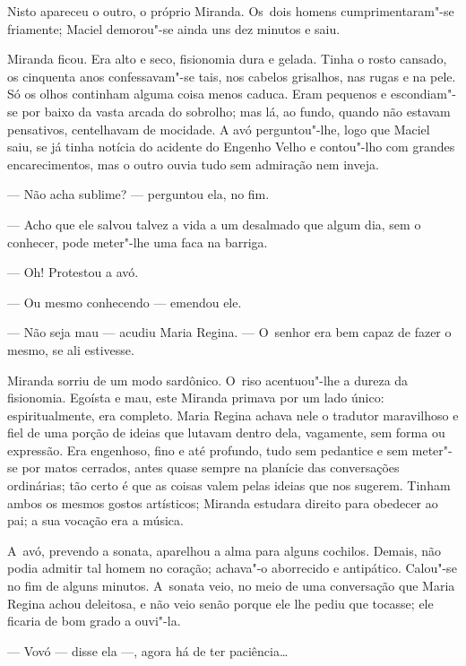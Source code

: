 \begin{linenumbers}
Nisto apareceu o outro, o próprio Miranda. Os~dois homens
cumprimentaram"-se friamente; Maciel demorou"-se ainda uns dez minutos e
saiu.

Miranda ficou. Era alto e seco, fisionomia dura e gelada. Tinha o rosto
cansado, os cinquenta anos confessavam"-se tais, nos cabelos grisalhos,
nas rugas e na pele. Só os olhos continham alguma coisa menos caduca.
Eram pequenos e escondiam"-se por baixo da vasta arcada do sobrolho; mas
lá, ao fundo, quando não estavam pensativos, centelhavam de mocidade. A
avó perguntou"-lhe, logo que Maciel saiu, se já tinha notícia do acidente
do Engenho Velho e contou"-lho com grandes encarecimentos, mas o outro
ouvia tudo sem admiração nem inveja.

--- Não acha sublime? --- perguntou ela, no fim.

--- Acho que ele salvou talvez a vida a um desalmado que algum dia, sem o
conhecer, pode meter"-lhe uma faca na barriga.

--- Oh! Protestou a avó.

--- Ou mesmo conhecendo --- emendou ele.

--- Não seja mau --- acudiu Maria Regina. --- O~senhor era bem capaz de
fazer o mesmo, se ali estivesse.

Miranda sorriu de um modo sardônico. O~riso acentuou"-lhe a dureza da
fisionomia. Egoísta e mau, este Miranda primava por um lado único:
espiritualmente, era completo. Maria Regina achava nele o tradutor
maravilhoso e fiel de uma porção de ideias que lutavam dentro dela,
vagamente, sem forma ou expressão. Era engenhoso, fino e até profundo,
tudo sem pedantice e sem meter"-se por matos cerrados, antes quase sempre
na planície das conversações ordinárias; tão certo é que as coisas valem
pelas ideias que nos sugerem. Tinham ambos os mesmos gostos artísticos;
Miranda estudara direito para obedecer ao pai; a sua vocação era a
música.

A~avó, prevendo a sonata, aparelhou a alma para alguns cochilos. Demais,
não podia admitir tal homem no coração; achava"-o aborrecido e
antipático. Calou"-se no fim de alguns minutos. A~sonata veio, no meio de
uma conversação que Maria Regina achou deleitosa, e não veio senão
porque ele lhe pediu que tocasse; ele ficaria de bom grado a ouvi"-la.

--- Vovó --- disse ela ---, agora há de ter paciência\ldots{}


\end{linenumbers}
